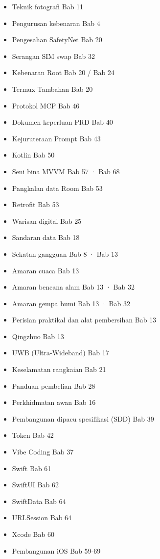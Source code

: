 
\begin{itemize}
  \item Teknik fotografi Bab 11
  \item Pengurusan kebenaran Bab 4
  \item Pengesahan SafetyNet Bab 20
  \item Serangan SIM swap Bab 32
  \item Kebenaran Root Bab 20 / Bab 24
  \item Termux Tambahan Bab 20
  \item Protokol MCP Bab 46
  \item Dokumen keperluan PRD Bab 40
  \item Kejuruteraan Prompt Bab 43
  \item Kotlin Bab 50
  \item Seni bina MVVM Bab 57 · Bab 68
  \item Pangkalan data Room Bab 53
  \item Retrofit Bab 53
\end{itemize}


\begin{itemize}
  \item Warisan digital Bab 25
  \item Sandaran data Bab 18
  \item Sekatan gangguan Bab 8 · Bab 13
  \item Amaran cuaca Bab 13
  \item Amaran bencana alam Bab 13 · Bab 32
  \item Amaran gempa bumi Bab 13 · Bab 32
  \item Perisian praktikal dan alat pembersihan Bab 13
  \item Qingzhuo Bab 13
  \item UWB (Ultra-Wideband) Bab 17
  \item Keselamatan rangkaian Bab 21
  \item Panduan pembelian Bab 28
  \item Perkhidmatan awan Bab 16
  \item Pembangunan dipacu spesifikasi (SDD) Bab 39
  \item Token Bab 42
  \item Vibe Coding Bab 37
  \item Swift Bab 61
  \item SwiftUI Bab 62
  \item SwiftData Bab 64
  \item URLSession Bab 64
  \item Xcode Bab 60
  \item Pembangunan iOS Bab 59-69
\end{itemize}

